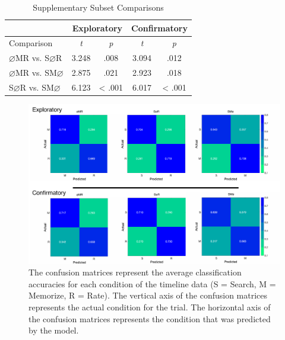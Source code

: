 \documentclass[
  english,
  man, donotrepeattitle,floatsintext]{apa6}
\begin{document}
\begin{table}[!h]
    \centering
    \caption{Supplementary Subset Comparisons}
    \label{tab:supp-comparisons}
    \begin{tabular}{l c c c c}
         & \multicolumn{2}{c}{Exploratory} & \multicolumn{2}{c}{Confirmatory} \\
        \hline
        Comparison & \textit{t} & \multicolumn{1}{c|}{\textit{p}} & \textit{t} & \textit{p} \\
        \hline
        $\varnothing$MR vs. S$\varnothing$R & 3.248 & \multicolumn{1}{c|}{.008} & 3.094 & .012 \\
        $\varnothing$MR vs. SM$\varnothing$ & 2.875 & \multicolumn{1}{c|}{.021} & 2.923 & .018 \\
        S$\varnothing$R vs. SM$\varnothing$ & 6.123 & \multicolumn{1}{c|}{< .001} & 6.017 & < .001 \\
        \hline
    \end{tabular}
\end{table}

\begin{figure}
\centering
\includegraphics{figures/supp_analysis/confusion_matrices/supp_conf_matrices.pdf}
\caption{\label{fig:supp-conf-matrices}The confusion matrices represent the average classification accuracies for each condition of the timeline data (S = Search, M = Memorize, R = Rate). The vertical axis of the confusion matrices represents the actual condition for the trial. The horizontal axis of the confusion matrices represents the condition that was predicted by the model.}
\end{figure}
\end{document}
